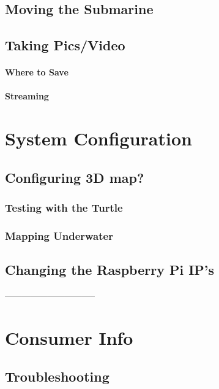 \documentclass[
10pt, %
a4paper, %
oneside, %
headinclude,footinclude, %
BCOR5mm, %
]{scrartcl}
\begin{document}

\subsection{Moving the Submarine}





\subsection{Taking Pics/Video}



\paragraph{Where to Save} 

\paragraph{Streaming} 



\section{System Configuration}




\subsection{Configuring 3D map?}


\subsubsection{Testing with the Turtle}


\subsubsection{Mapping Underwater}



\subsection{Changing the Raspberry Pi IP's}

--------------------------------

\section{Consumer Info}

\subsection{Troubleshooting}
\end{document}
